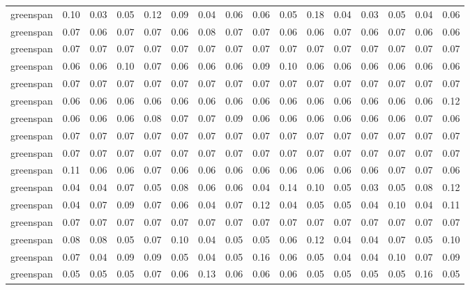 \begin{tabular}{lrrrrrrrrrrrrrrr}
 greenspan & 0.10 & 0.03 & 0.05 & 0.12 & 0.09 & 0.04 & 0.06 & 0.06 & 0.05 &  0.18 &  0.04 &  0.03 &  0.05 &  0.04 &  0.06 \\
 greenspan & 0.07 & 0.06 & 0.07 & 0.07 & 0.06 & 0.08 & 0.07 & 0.07 & 0.06 &  0.06 &  0.07 &  0.06 &  0.07 &  0.06 &  0.06 \\
 greenspan & 0.07 & 0.07 & 0.07 & 0.07 & 0.07 & 0.07 & 0.07 & 0.07 & 0.07 &  0.07 &  0.07 &  0.07 &  0.07 &  0.07 &  0.07 \\
 greenspan & 0.06 & 0.06 & 0.10 & 0.07 & 0.06 & 0.06 & 0.06 & 0.09 & 0.10 &  0.06 &  0.06 &  0.06 &  0.06 &  0.06 &  0.06 \\
 greenspan & 0.07 & 0.07 & 0.07 & 0.07 & 0.07 & 0.07 & 0.07 & 0.07 & 0.07 &  0.07 &  0.07 &  0.07 &  0.07 &  0.07 &  0.07 \\
 greenspan & 0.06 & 0.06 & 0.06 & 0.06 & 0.06 & 0.06 & 0.06 & 0.06 & 0.06 &  0.06 &  0.06 &  0.06 &  0.06 &  0.06 &  0.12 \\
 greenspan & 0.06 & 0.06 & 0.06 & 0.08 & 0.07 & 0.07 & 0.09 & 0.06 & 0.06 &  0.06 &  0.06 &  0.06 &  0.06 &  0.07 &  0.06 \\
 greenspan & 0.07 & 0.07 & 0.07 & 0.07 & 0.07 & 0.07 & 0.07 & 0.07 & 0.07 &  0.07 &  0.07 &  0.07 &  0.07 &  0.07 &  0.07 \\
 greenspan & 0.07 & 0.07 & 0.07 & 0.07 & 0.07 & 0.07 & 0.07 & 0.07 & 0.07 &  0.07 &  0.07 &  0.07 &  0.07 &  0.07 &  0.07 \\
 greenspan & 0.11 & 0.06 & 0.06 & 0.07 & 0.06 & 0.06 & 0.06 & 0.06 & 0.06 &  0.06 &  0.06 &  0.06 &  0.07 &  0.07 &  0.06 \\
 greenspan & 0.04 & 0.04 & 0.07 & 0.05 & 0.08 & 0.06 & 0.06 & 0.04 & 0.14 &  0.10 &  0.05 &  0.03 &  0.05 &  0.08 &  0.12 \\
 greenspan & 0.04 & 0.07 & 0.09 & 0.07 & 0.06 & 0.04 & 0.07 & 0.12 & 0.04 &  0.05 &  0.05 &  0.04 &  0.10 &  0.04 &  0.11 \\
 greenspan & 0.07 & 0.07 & 0.07 & 0.07 & 0.07 & 0.07 & 0.07 & 0.07 & 0.07 &  0.07 &  0.07 &  0.07 &  0.07 &  0.07 &  0.07 \\
 greenspan & 0.08 & 0.08 & 0.05 & 0.07 & 0.10 & 0.04 & 0.05 & 0.05 & 0.06 &  0.12 &  0.04 &  0.04 &  0.07 &  0.05 &  0.10 \\
 greenspan & 0.07 & 0.04 & 0.09 & 0.09 & 0.05 & 0.04 & 0.05 & 0.16 & 0.06 &  0.05 &  0.04 &  0.04 &  0.10 &  0.07 &  0.09 \\
 greenspan & 0.05 & 0.05 & 0.05 & 0.07 & 0.06 & 0.13 & 0.06 & 0.06 & 0.06 &  0.05 &  0.05 &  0.05 &  0.05 &  0.16 &  0.05 \\

\end{tabular}
